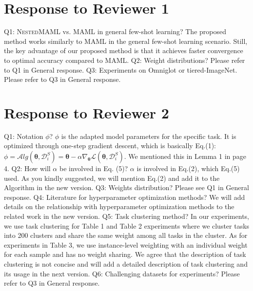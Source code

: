 \documentclass[letterpaper]{article} %
\newcommand{\sysname}{\textsc{NestedMAML}}
\begin{document}
\section{Response to Reviewer 1}
{\color{blue}Q1: \sysname{} vs. MAML in general few-shot learning?} The proposed method works similarly to MAML in the general few-shot learning scenario. Still, the key advantage of our proposed method is that it achieves faster convergence to optimal accuracy compared to MAML. {\noindent}{\color{blue}Q2: Weight distributions?} Please refer to Q1 in General response. {\noindent}{\color{blue}Q3: Experiments on Omniglot or tiered-ImageNet.} Please refer to Q3 in General response.
\vspace{-3mm}
\section{Response to Reviewer 2}
{\color{blue}Q1: Notation $\phi$?}
$\phi$ is the adapted model parameters for the specific task. It is optimized through one-step gradient descent, which is basically Eq.(1): $\phi = \mathcal{A}lg(\boldsymbol{\theta}, \mathcal{D}_{i}^{S}) = \boldsymbol{\theta} - \alpha \nabla_{\boldsymbol{\theta}}\mathcal{L}(\boldsymbol{\theta}, \mathcal{D}_{i}^{S})$. We mentioned this in Lemma 1 in page 4. {\color{blue}{\noindent}Q2: How will $\alpha$ be involved in Eq. (5)?}
$\alpha$ is involved in Eq.(2), which Eq.(5) used. As you kindly suggested, we will mention Eq.(2) and add it to the Algorithm in the new version. {\noindent}{\color{blue}Q3: Weights distribution?}
Please see Q1 in General response. {\noindent}{\color{blue}Q4: Literature for hyperparameter optimization methods?} We will add details on the relationship with hyperparameter optimization methods to the related work in the new version. {\noindent}{\color{blue}Q5: Task clustering method?} In our experiments, we use task clustering for Table 1 and Table 2 experiments where we cluster tasks into 200 clusters and share the same weight among all tasks in the cluster. As for experiments in Table 3, we use instance-level weighting with an individual weight for each sample and has no weight sharing. We agree that the description of task clustering is not concise and will add a detailed description of task clustering and its usage in the next version.{\noindent} {\color{blue} Q6: Challenging datasets for experiments?} Please refer to Q3 in General response.
\vspace{-3mm}
\end{document}

